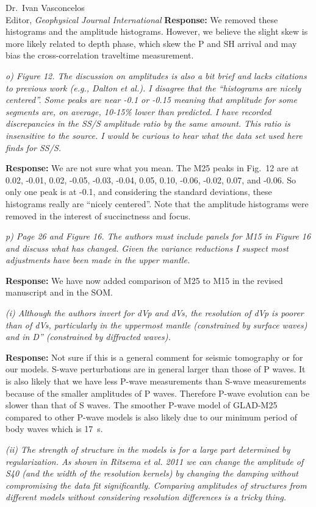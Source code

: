 \documentclass[11pt,a4paper]{letter}
\newcommand{\response}[1]{\textbf{Response:} #1}
\newcommand{\rev}[1]{{\it{#1}}}
\begin{document}
\begin{letter}{Dr.~Ivan Vasconcelos\\
Editor, \textit{Geophysical Journal International}}
\response{We removed these histograms and the amplitude histograms. However, we believe the slight skew is more likely related to depth phase, which skew the P and SH arrival and may bias the cross-correlation traveltime measurement.}

\rev{o) Figure 12. The discussion on amplitudes is also a bit brief and lacks citations to previous work (e.g., Dalton et al.).
I disagree that the ``histograms are nicely centered''. Some peaks are near -0.1 or -0.15 meaning that amplitude for some segments are, on average, 10-15\% lower than predicted. I have recorded discrepancies in the SS/S amplitude ratio by the same amount.
This ratio is insensitive to the source. I would be curious to hear what the data set used here finds for SS/S.
}

\response{We are not sure what you mean. The M25 peaks in Fig.~12 are at 0.02, -0.01, 0.02, -0.05, -0.03, -0.04, 0.05, 0.10, -0.06, -0.02, 0.07, and -0.06. So only one peak is at -0.1, and considering the standard deviations, these histograms really are ``nicely centered''.
Note that the amplitude histograms were removed in the interest of succinctness and focus.}

\rev{p) Page 26 and Figure 16. The authors must include panels for M15 in Figure 16 and discuss what has changed.
Given the variance reductions I suspect most adjustments have been made in the upper mantle. }

\response{We have now added comparison of M25 to M15 in the revised manuscript and in the SOM.}


\rev{(i) Although the authors invert for dVp and dVs, the resolution of dVp is poorer than of dVs, particularly in the uppermost mantle (constrained by surface waves) and in D'' (constrained by diffracted waves).}

\response{Not sure if this is a general comment for seismic tomography or for our models. S-wave perturbations are in general larger than those of P waves. It is also likely that we have less P-wave measurements than S-wave measurements because of the smaller amplitudes of P waves. Therefore P-wave evolution can be slower than that of S waves. The smoother P-wave model of GLAD-M25 compared to other P-wave models is also likely due to our minimum period of body waves which is 17~s.}

\rev{(ii) The strength of structure in the models is for a large part determined by regularization. As shown in Ritsema et al. 2011 we can change the amplitude of S40 (and the width of the resolution kernels) by changing the damping without compromising the data fit significantly. Comparing amplitudes of structures from different models without considering resolution differences is a tricky thing.}


\end{letter}
\end{document}
